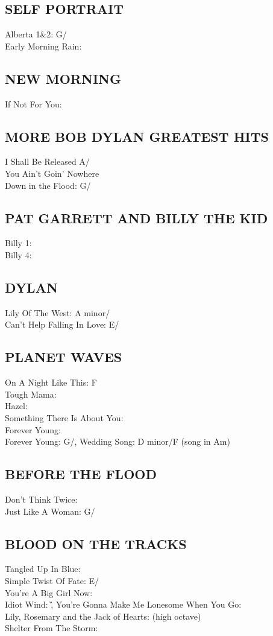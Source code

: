 \documentclass[a4paper,twoside]{memoir}
\begin{document}
\subsection{SELF PORTRAIT}
Alberta 1\&2: G/\C\\ Early Morning Rain: \C


\subsection{NEW MORNING}
If Not For You: \E


\subsection{MORE BOB DYLAN GREATEST HITS}
I Shall Be Released A/\D\\
You Ain't Goin' Nowhere \G\\
Down in the Flood: G/\C


\subsection{PAT GARRETT AND BILLY THE KID}
Billy 1: \G\\ Billy 4: \A


\subsection{DYLAN}
Lily Of The West: A minor/\C\\ Can't Help Falling In Love:
E/\A


\subsection{PLANET WAVES}
On A Night Like This: F\\ Tough Mama: \D\\ Hazel: \E\\ Something There Is About You: \G\\ Forever Young: \D\\ Forever Young: G/\C,
Wedding Song: D minor/F (song in Am)


\subsection{BEFORE THE FLOOD}
Don't Think Twice: \C\\ Just Like A Woman: G/\C


\subsection{BLOOD ON THE TRACKS}
Tangled Up In Blue: \A\\ Simple Twist Of Fate: E/\A\\ You're A Big Girl Now: \G\\ Idiot Wind: \G,
You're Gonna Make Me Lonesome When You Go: \E\\ Lily, Rosemary and the Jack of Hearts: \D (high octave)\\ Shelter From The Storm: \E
\end{document}
